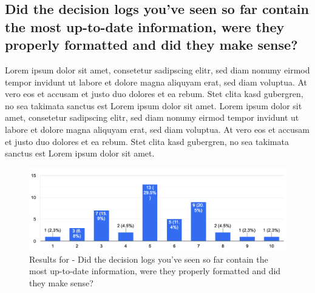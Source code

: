 \subsection{Did the decision logs you've seen so far contain the most up-to-date information, were they properly formatted and did they make sense?}
Lorem ipsum dolor sit amet, consetetur sadipscing elitr, sed diam nonumy eirmod tempor invidunt ut labore et dolore magna aliquyam erat, sed diam voluptua. At vero eos et accusam et justo duo dolores et ea rebum. Stet clita kasd gubergren, no sea takimata sanctus est Lorem ipsum dolor sit amet. Lorem ipsum dolor sit amet, consetetur sadipscing elitr, sed diam nonumy eirmod tempor invidunt ut labore et dolore magna aliquyam erat, sed diam voluptua. At vero eos et accusam et justo duo dolores et ea rebum. Stet clita kasd gubergren, no sea takimata sanctus est Lorem ipsum dolor sit amet.
\begin{figure}[h!]
\centering
\includegraphics[width=\linewidth]{Images/Survey/decisions_2.png}
\caption{Results for - Did the decision logs you've seen so far contain the most up-to-date information, were they properly formatted and did they make sense?}
\label{fig:results:decisions:2}
\end{figure}

